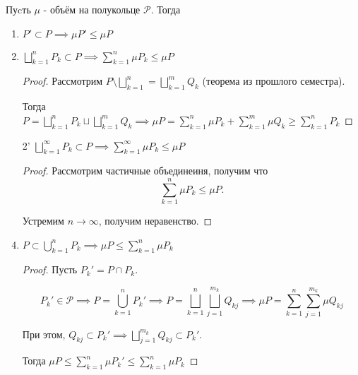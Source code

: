 \begin{properties} \thmslashn

    Пуcть $\mu$ - объём на полукольце $\mathcal{P}$. Тогда

    \begin{enumerate}
        \item $P' \subset P \implies \mu P' \le \mu P$
        \item $\bigsqcup\limits_{k=1}^{n} P_{k} \subset P \implies \sum\limits_{k=1}^{n} \mu P_{k} \le \mu P$
            \begin{proof} \thmslashn
            
                Рассмотрим $P \setminus \bigsqcup\limits_{k=1}^{n} = \bigsqcup\limits_{k=1}^{m} Q_{k} $ (теорема из прошлого семестра).

                Тогда $P = \bigsqcup\limits_{k=1}^{n} P_{k}\sqcup \bigsqcup\limits_{k=1}^{m} Q_{k} \implies \mu P = \sum\limits_{k=1}^{n} \mu P_{k} + \sum\limits_{k=1}^{m} \mu Q_{k} \ge \sum\limits_{k=1}^{n} P_{k}  $
            \end{proof}
        \item[2'] $\bigsqcup\limits_{k=1}^{\infty} P_{k} \subset P \implies \sum\limits_{k=1}^{\infty} \mu P_{k} \le \mu P$
            \begin{proof} \thmslashn
            
                Рассмотрим частичные объединеиня, получим что 
                \[ \sum\limits_{k=1}^{n} \mu P_{k} \le \mu P .\] 

                Устремим $n \to \infty$, получим неравенство.
            \end{proof}
        \item $P \subset \bigcup\limits_{k=1}^{n} P_{k} \implies \mu P \le \sum\limits_{k=1}^{n} \mu P_{k}$
            \begin{proof} \thmslashn
            
                Пусть $P_{k}' = P\cap P_{k}$. 
                
                \[P_{k}'\in \mathcal{P} \implies P = \bigcup\limits_{k=1}^{n} P_{k}' \implies P = \bigsqcup\limits_{k=1}^{n} \bigsqcup\limits_{j=1}^{m_{k}} Q_{kj} \implies \mu P = \sum\limits_{k=1}^{n}\sum\limits_{j=1}^{m_{k}} \mu Q_{kj}\]

                При этом, $Q_{kj} \subset P_{k}' \implies \bigsqcup\limits_{j=1}^{m_{k}} Q_{kj} \subset P_{k}'$.

                Тогда $\mu P \le \sum\limits_{k=1}^{n} \mu P_{k}' \le \sum\limits_{k=1}^{n} \mu P_{k}$
            \end{proof}
    \end{enumerate}
\end{properties}
